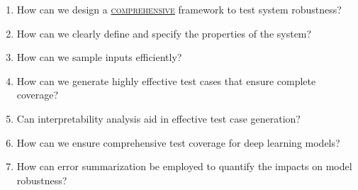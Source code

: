 \begin{enumerate}
  \item How can we design a \hyperref[gloss]{\textsc{comprehensive}}\label{comprehensive} framework to test system robustness?
    \item How can we clearly define and specify the properties of the system?    
    \item How can we sample inputs efficiently?
    \item How can we generate highly effective test cases that ensure complete coverage?                                                                                                                                                     
    \item Can interpretability analysis aid in effective test case generation?
    \item How can we ensure comprehensive test coverage for deep learning models?
    \item How can error summarization be employed to quantify the impacts on model robustness?
      
        

       
    
    
 
        
        

       
    
  

\end{enumerate}


